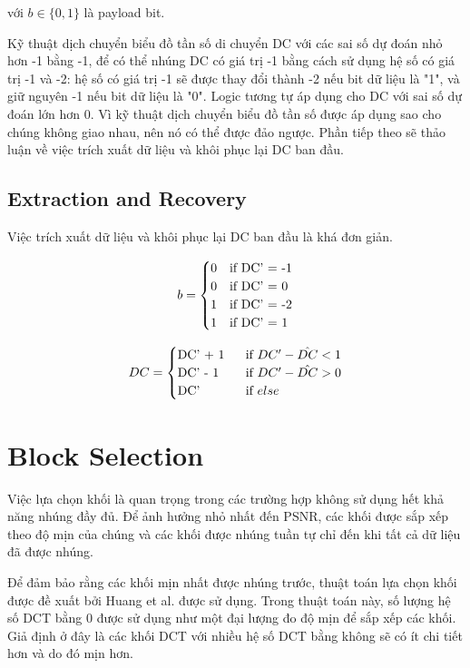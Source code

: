 với $b \in \{0, 1\}$ là payload bit.

Kỹ thuật dịch chuyển biểu đồ tần số di chuyển DC với các sai số dự đoán nhỏ hơn -1 bằng -1, để có thể nhúng DC có giá trị -1 bằng cách sử dụng hệ số có giá trị -1 và -2: hệ số có giá trị -1 sẽ được thay đổi thành -2 nếu bit dữ liệu là "1", và giữ nguyên -1 nếu bit dữ liệu là "0". Logic tương tự áp dụng cho DC với sai số dự đoán lớn hơn 0. Vì kỹ thuật dịch chuyển biểu đồ tần số được áp dụng sao cho chúng không giao nhau, nên nó có thể được đảo ngược. Phần tiếp theo sẽ thảo luận về việc trích xuất dữ liệu và khôi phục lại  DC ban đầu.

\subsection{Extraction and Recovery}

Việc trích xuất dữ liệu và khôi phục lại DC ban đầu là khá đơn giản.

\begin{equation}
\label{eq:Extraction_1}
b= \begin{cases}
$0$ & $if  DC' = -1$ \\
$0$ & $if  DC' = 0$ \\
$1$ & $if  DC' = -2$ \\
$1$ & $if  DC' = 1$ \\
\end{cases}
\end{equation}

\begin{equation}
\label{eq:Extraction_2}
DC= \begin{cases}
$DC' + 1 $ & $ if $  DC' - \hat{DC} < 1 \\
$DC' - 1 $ & $ if  $  DC' - \hat{DC} > 0 \\
$DC'$ & $  if $ else\\
\end{cases}
\end{equation}

\section{Block Selection}

Việc lựa chọn khối là quan trọng trong các trường hợp không sử dụng hết khả năng nhúng đầy đủ. Để ảnh hưởng nhỏ nhất đến PSNR, các khối được sắp xếp theo độ mịn của chúng và các khối được nhúng tuần tự chỉ đến khi tất cả dữ liệu đã được nhúng. 

Để đảm bảo rằng các khối mịn nhất được nhúng trước, thuật toán lựa chọn khối được đề xuất bởi Huang et al. được sử dụng. Trong thuật toán này, số lượng hệ số DCT bằng 0 được sử dụng như một đại lượng đo độ mịn để sắp xếp các khối. Giả định ở đây là các khối DCT với nhiều hệ số DCT bằng không sẽ có ít chi tiết hơn và do đó mịn hơn. 

